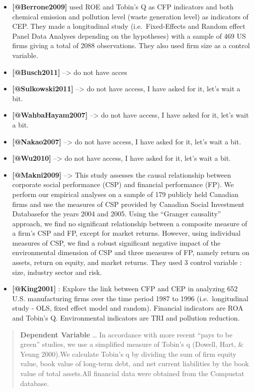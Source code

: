 \documentclass[]{article}
\begin{document}
\begin{itemize}
\item
  \textbf{{[}@Berrone2009{]}} used ROE and Tobin's Q as CFP indicators
  and both chemical emission and pollution level (waste generation
  level) as indicators of CEP. They made a longitudinal study
  (i.e.~Fixed-Effects and Random effect Panel Data Analyses depending on
  the hypotheses) with a sample of 469 US firms giving a total of 2088
  observations. They also used firm size as a control variable.
\item
  \textbf{{[}@Busch2011{]}} --\textgreater{} do not have acces
\item
  \textbf{{[}@Sulkowski2011{]}} --\textgreater{} do not have access, I
  have asked for it, let's wait a bit.
\item
  \textbf{{[}@WahbaHayam2007{]}} --\textgreater{} do not have access, I
  have asked for it, let's wait a bit.
\item
  \textbf{{[}@Nakao2007{]}} --\textgreater{} do not have access, I have
  asked for it, let's wait a bit.
\item
  \textbf{{[}@Wu2010{]}} --\textgreater{} do not have access, I have
  asked for it, let's wait a bit.
\item
  \textbf{{[}@Makni2009{]}} --\textgreater{} This study assesses the
  causal relationship between corporate social performance (CSP) and
  financial performance (FP). We perform our empirical analyses on a
  sample of 179 publicly held Canadian firms and use the measures of CSP
  provided by Canadian Social Investment Databasefor the years 2004 and
  2005. Using the ``Granger causality'' approach, we find no significant
  relationship between a composite measure of a firm's CSP and FP,
  except for market returns. However, using individual measures of CSP,
  we find a robust significant negative impact of the environmental
  dimension of CSP and three measures of FP, namely return on assets,
  return on equity, and market returns. They used 3 control variable :
  size, industry sector and risk.
\item
  \textbf{{[}@King2001{]}} : Explore the link between CFP and CEP in
  analyzing 652 U.S. manufacturing firms over the time period 1987 to
  1996 (i.e.~longitudinal study - OLS, fixed effect model and random).
  Financial indicators are ROA and Tobin's Q. Environmental indicators
  are TRI and pollution reduction.
\end{itemize}

\begin{quote}
\textbf{Dependent Variable} \ldots{} In accordance with more recent
``pays to be green'' studies, we use a simplified measure of Tobin's q
(Dowell, Hart, \& Yeung 2000).We calculate Tobin's q by dividing the sum
of firm equity value, book value of long-term debt, and net current
liabilities by the book value of total assets.All financial data were
obtained from the Compustat database.
\end{quote}
\end{document}
